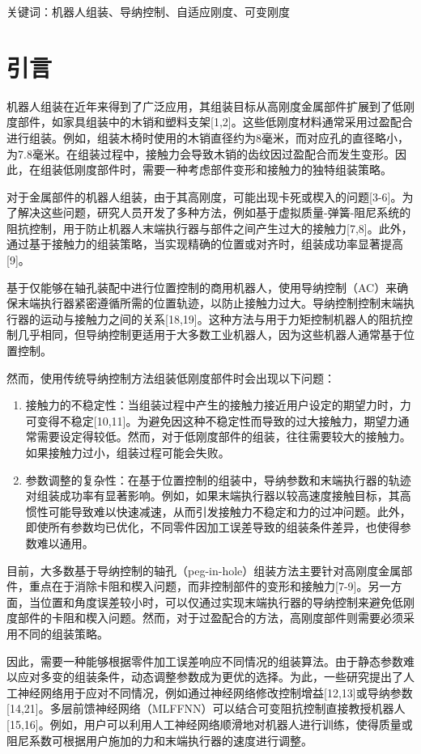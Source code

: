 \documentclass{Diploma}
\begin{document}
关键词：机器人组装、导纳控制、自适应刚度、可变刚度
\section{引言}
机器人组装在近年来得到了广泛应用，其组装目标从高刚度金属部件扩展到了低刚度部件，如家具组装中的木销和塑料支架[1,2]。这些低刚度材料通常采用过盈配合进行组装。例如，组装木椅时使用的木销直径约为8毫米，而对应孔的直径略小，为7.8毫米。在组装过程中，接触力会导致木销的齿纹因过盈配合而发生变形。因此，在组装低刚度部件时，需要一种考虑部件变形和接触力的独特组装策略。

对于金属部件的机器人组装，由于其高刚度，可能出现卡死或楔入的问题[3-6]。为了解决这些问题，研究人员开发了多种方法，例如基于虚拟质量-弹簧-阻尼系统的阻抗控制，用于防止机器人末端执行器与部件之间产生过大的接触力[7,8]。此外，通过基于接触力的组装策略，当实现精确的位置或对齐时，组装成功率显著提高[9]。

基于仅能够在轴孔装配中进行位置控制的商用机器人，使用导纳控制（AC）来确保末端执行器紧密遵循所需的位置轨迹，以防止接触力过大。导纳控制控制末端执行器的运动与接触力之间的关系[18,19]。这种方法与用于力矩控制机器人的阻抗控制几乎相同，但导纳控制更适用于大多数工业机器人，因为这些机器人通常基于位置控制。

然而，使用传统导纳控制方法组装低刚度部件时会出现以下问题：

\begin{enumerate}
  \item 接触力的不稳定性：当组装过程中产生的接触力接近用户设定的期望力时，力可变得不稳定[10,11]。为避免因这种不稳定性而导致的过大接触力，期望力通常需要设定得较低。然而，对于低刚度部件的组装，往往需要较大的接触力。如果接触力过小，组装过程可能会失败。
  \item 参数调整的复杂性：在基于位置控制的组装中，导纳参数和末端执行器的轨迹对组装成功率有显著影响。例如，如果末端执行器以较高速度接触目标，其高惯性可能导致难以快速减速，从而引发接触力不稳定和力的过冲问题。此外，即使所有参数均已优化，不同零件因加工误差导致的组装条件差异，也使得参数难以通用。
\end{enumerate}

目前，大多数基于导纳控制的轴孔（peg-in-hole）组装方法主要针对高刚度金属部件，重点在于消除卡阻和楔入问题，而非控制部件的变形和接触力[7-9]。另一方面，当位置和角度误差较小时，可以仅通过实现末端执行器的导纳控制来避免低刚度部件的卡阻和楔入问题。然而，对于过盈配合的方法，高刚度部件则需要必须采用不同的组装策略。

因此，需要一种能够根据零件加工误差响应不同情况的组装算法。由于静态参数难以应对多变的组装条件，动态调整参数成为更优的选择。为此，一些研究提出了人工神经网络用于应对不同情况，例如通过神经网络修改控制增益[12,13]或导纳参数[14,21]。多层前馈神经网络（MLFFNN）可以结合可变阻抗控制直接教授机器人[15,16]。例如，用户可以利用人工神经网络顺滑地对机器人进行训练，使得质量或阻尼系数可根据用户施加的力和末端执行器的速度进行调整。
\end{document}
